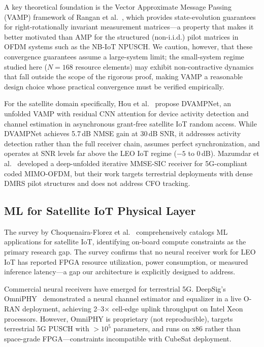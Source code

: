 \documentclass{article}
\begin{document}
A key theoretical foundation is the Vector Approximate Message Passing (VAMP) framework of Rangan et al.~\cite{rangan2017vamp,rangan2019vamp}, which provides state-evolution guarantees for right-rotationally invariant measurement matrices---a property that makes it better motivated than AMP for the structured (non-i.i.d.) pilot matrices in OFDM systems such as the NB-IoT NPUSCH. We caution, however, that these convergence guarantees assume a large-system limit; the small-system regime studied here ($N = 168$ resource elements) may exhibit non-contractive dynamics that fall outside the scope of the rigorous proof, making VAMP a reasonable design choice whose practical convergence must be verified empirically.

For the satellite domain specifically, Hou et al.~\cite{hou2025dvampnet} propose DVAMPNet, an unfolded VAMP with residual CNN attention for device activity detection and channel estimation in asynchronous grant-free satellite IoT random access. While DVAMPNet achieves 5.7\,dB NMSE gain at 30\,dB SNR, it addresses activity detection rather than the full receiver chain, assumes perfect synchronization, and operates at SNR levels far above the LEO IoT regime ($-5$ to 0\,dB). Mazumdar et al.~\cite{mazumdar2024dui} developed a deep-unfolded iterative MMSE-SIC receiver for 5G-compliant coded MIMO-OFDM, but their work targets terrestrial deployments with dense DMRS pilot structures and does not address CFO tracking.

\subsection{ML for Satellite IoT Physical Layer}

The survey by Choquenaira-Florez et al.~\cite{choquenaira2025ml} comprehensively catalogs ML applications for satellite IoT, identifying on-board compute constraints as the primary research gap. The survey confirms that no neural receiver work for LEO IoT has reported FPGA resource utilization, power consumption, or measured inference latency---a gap our architecture is explicitly designed to address.

Commercial neural receivers have emerged for terrestrial 5G. DeepSig's OmniPHY~\cite{deepsig2024} demonstrated a neural channel estimator and equalizer in a live O-RAN deployment, achieving 2--3$\times$ cell-edge uplink throughput on Intel Xeon processors. However, OmniPHY is proprietary (not reproducible), targets terrestrial 5G PUSCH with $>10^5$ parameters, and runs on x86 rather than space-grade FPGA---constraints incompatible with CubeSat deployment.
\end{document}
